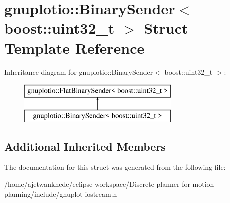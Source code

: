\hypertarget{structgnuplotio_1_1BinarySender_3_01boost_1_1uint32__t_01_4}{}\section{gnuplotio\+:\+:Binary\+Sender$<$ boost\+:\+:uint32\+\_\+t $>$ Struct Template Reference}
\label{structgnuplotio_1_1BinarySender_3_01boost_1_1uint32__t_01_4}
Inheritance diagram for gnuplotio\+:\+:Binary\+Sender$<$ boost\+:\+:uint32\+\_\+t $>$\+:\begin{figure}[H]
\begin{center}
\leavevmode
\includegraphics[height=2.000000cm]{structgnuplotio_1_1BinarySender_3_01boost_1_1uint32__t_01_4}
\end{center}
\end{figure}
\subsection*{Additional Inherited Members}


The documentation for this struct was generated from the following file\+:\begin{DoxyCompactItemize}
\item 
/home/ajetwankhede/eclipse-\/workspace/\+Discrete-\/planner-\/for-\/motion-\/planning/include/gnuplot-\/iostream.\+h\end{DoxyCompactItemize}
